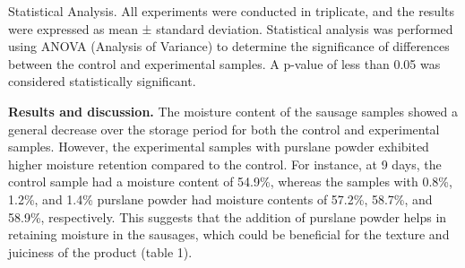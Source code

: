 Statistical Analysis. All experiments were conducted in triplicate, and
the results were expressed as mean ± standard deviation. Statistical
analysis was performed using ANOVA (Analysis of Variance) to determine
the significance of differences between the control and experimental
samples. A p-value of less than 0.05 was considered statistically
significant.

{\bfseries Results and discussion.} The moisture content of the sausage
samples showed a general decrease over the storage period for both the
control and experimental samples. However, the experimental samples with
purslane powder exhibited higher moisture retention compared to the
control. For instance, at 9 days, the control sample had a moisture
content of 54.9\%, whereas the samples with 0.8\%, 1.2\%, and 1.4\%
purslane powder had moisture contents of 57.2\%, 58.7\%, and 58.9\%,
respectively. This suggests that the addition of purslane powder helps
in retaining moisture in the sausages, which could be beneficial for the
texture and juiciness of the product (table 1).

